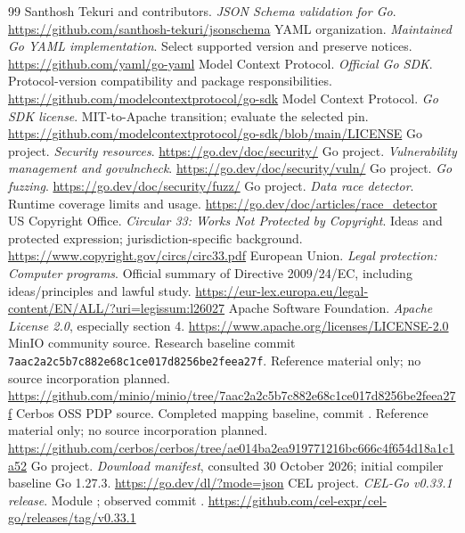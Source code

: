 \begin{thebibliography}{99}
 Santhosh Tekuri and contributors. \emph{JSON Schema validation for Go}. \url{https://github.com/santhosh-tekuri/jsonschema}
 YAML organization. \emph{Maintained Go YAML implementation}. Select supported version and preserve notices. \url{https://github.com/yaml/go-yaml}
 Model Context Protocol. \emph{Official Go SDK}. Protocol-version compatibility and package responsibilities. \url{https://github.com/modelcontextprotocol/go-sdk}
 Model Context Protocol. \emph{Go SDK license}. MIT-to-Apache transition; evaluate the selected pin. \url{https://github.com/modelcontextprotocol/go-sdk/blob/main/LICENSE}
 Go project. \emph{Security resources}. \url{https://go.dev/doc/security/}
 Go project. \emph{Vulnerability management and govulncheck}. \url{https://go.dev/doc/security/vuln/}
 Go project. \emph{Go fuzzing}. \url{https://go.dev/doc/security/fuzz/}
 Go project. \emph{Data race detector}. Runtime coverage limits and usage. \url{https://go.dev/doc/articles/race_detector}
 US Copyright Office. \emph{Circular 33: Works Not Protected by Copyright}. Ideas and protected expression; jurisdiction-specific background. \url{https://www.copyright.gov/circs/circ33.pdf}
 European Union. \emph{Legal protection: Computer programs}. Official summary of Directive 2009/24/EC, including ideas/principles and lawful study. \url{https://eur-lex.europa.eu/legal-content/EN/ALL/?uri=legissum:l26027}
 Apache Software Foundation. \emph{Apache License 2.0}, especially section 4. \url{https://www.apache.org/licenses/LICENSE-2.0}
 MinIO community source. Research baseline commit \texttt{7aac2a2c5b7c882e68c1ce017d8256be2feea27f}. Reference material only; no source incorporation planned. \url{https://github.com/minio/minio/tree/7aac2a2c5b7c882e68c1ce017d8256be2feea27f}
 Cerbos OSS PDP source. Completed mapping baseline, commit . Reference material only; no source incorporation planned. \url{https://github.com/cerbos/cerbos/tree/ae014ba2ea919771216bc666c4f654d18a1c1a52}
 Go project. \emph{Download manifest}, consulted 30 October 2026; initial compiler baseline Go 1.27.3. \url{https://go.dev/dl/?mode=json}
 CEL project. \emph{CEL-Go v0.33.1 release}. Module ; observed commit . \url{https://github.com/cel-expr/cel-go/releases/tag/v0.33.1}

\end{thebibliography}
